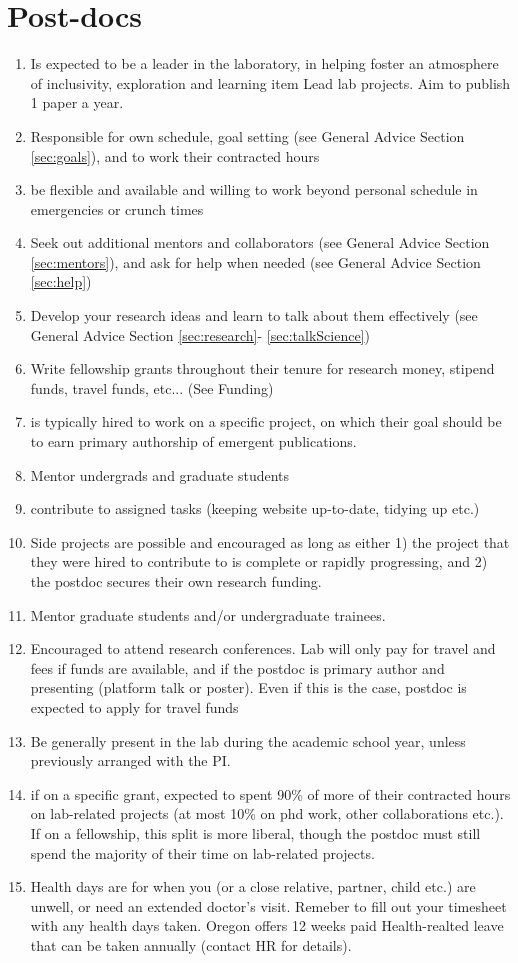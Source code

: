 \documentclass[12pt]{article}
\begin{document}
\section{Post-docs}
\begin{enumerate}
\item Is expected to be a leader in the laboratory, in helping foster
  an atmosphere of inclusivity, exploration and learning
 item Lead lab projects. Aim to publish 1 paper a year.
\item  Responsible for own schedule, goal setting (see General
  Advice Section \ref{sec:goals}), and to work their contracted hours
\item be flexible and available and willing to work beyond personal
  schedule in emergencies or crunch times
\item Seek out additional mentors and collaborators (see General
  Advice Section \ref{sec:mentors}), and ask for help when needed (see
  General Advice Section \ref{sec:help})
\item Develop your research ideas and learn to talk about them
  effectively (see General Advice Section \ref{sec:research}-
  \ref{sec:talkScience})
\item  Write fellowship grants throughout their tenure
  for research money, stipend funds, travel funds, etc... (See Funding)
\item is typically hired to work on a specific project, on which
  their goal should be to earn primary authorship of emergent
  publications.
\item Mentor undergrads and graduate students
\item contribute to assigned tasks (keeping website up-to-date,
  tidying up etc.)
\item Side projects are possible and encouraged as long as either 1)
  the project that they were hired to contribute to is complete or
  rapidly progressing, and 2) the postdoc secures their own research
  funding.
\item Mentor graduate students and/or undergraduate trainees.
\item Encouraged to attend research conferences. Lab will only pay
  for travel and fees if funds are available, and if the postdoc is
  primary author and presenting (platform talk or poster). Even if
  this is the case, postdoc is expected to apply for travel funds
\item Be generally present in the lab during the academic school year,
  unless previously arranged with the PI.
\item if on a specific grant, expected to spent 90\% of more of
  their contracted hours on lab-related projects (at most 10\%
  on phd work, other collaborations etc.). If on a fellowship,
  this split is more liberal, though the postdoc must still
  spend the majority of their time on lab-related projects.
\item Health days are for when you (or a close relative, partner,
  child etc.) are unwell, or need an extended doctor's visit. Remeber
  to fill out your timesheet with any health days taken. Oregon offers
  12 weeks paid Health-realted leave that can be taken annually
  (contact HR for details).
\end{enumerate}
\end{document}
